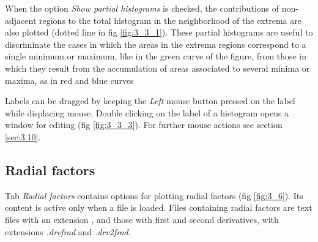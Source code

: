 \documentclass[10pt]{article}
\begin{document}
\vspace*{5mm}

When the option {\it Show partial histograms} is checked, the contributions of non-adjacent regions 
to the total histogram in the neighborhood of the extrema are also plotted (dotted line in fig \ref{fig:3_3_1}). These partial histograms are useful
to discriminate the cases in which the areas in the extrema regions correspond to a single minimum or maximum, like in the green curve of the figure, from those in which
they result from the accumulation of areas associated to several minima or maxima, as in red and blue curves

Labels can be dragged by keeping the {\it Left} mouse button pressed on the label while displacing mouse. 
Double clicking on the label of a histogram opens a window for editing (fig \ref{fig:3_3_3}). For further mouse actions see section \ref{sec:3.10}.

\subsection{Radial factors \label{sec:3.4}}

Tab {\it Radial factors} contains options
for plotting radial factors (fig \ref{fig:3_6}). Its content is active only when a \frad{ } file
is loaded. Files containing radial factors are text files with an extension \frad{ }, and those 
with first and second derivatives, with extensions {\it .drvfrad} and {\it .drv2frad}.
\end{document}
